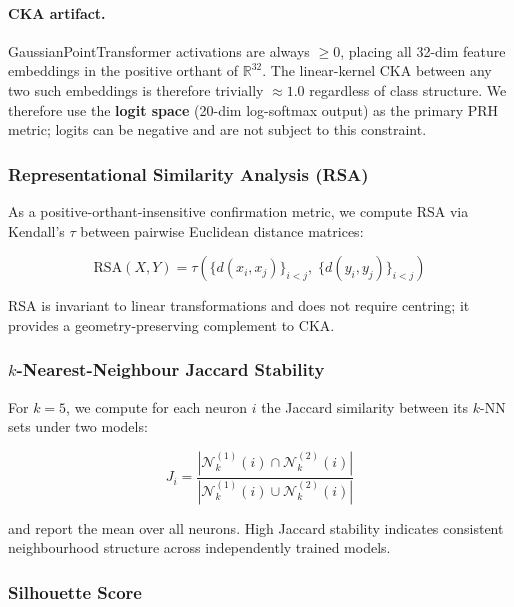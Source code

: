 \paragraph{CKA artifact.}
\label{sec:cka-artifact}
GaussianPointTransformer activations are always $\geq 0$, placing all 32-dim
feature embeddings in the positive orthant of $\mathbb{R}^{32}$.  The linear-kernel
CKA between any two such embeddings is therefore trivially $\approx 1.0$
regardless of class structure.  We therefore use the \textbf{logit space}
(20-dim log-softmax output) as the primary PRH metric; logits can be negative
and are not subject to this constraint.

\subsubsection{Representational Similarity Analysis (RSA)}

As a positive-orthant-insensitive confirmation metric, we compute RSA via
Kendall's $\tau$ between pairwise Euclidean distance matrices:

\begin{equation}
  \text{RSA}(X, Y) = \tau\!\left(\{d(x_i, x_j)\}_{i<j},\; \{d(y_i, y_j)\}_{i<j}\right)
\end{equation}

RSA is invariant to linear transformations and does not require centring; it
provides a geometry-preserving complement to CKA.

\subsubsection{$k$-Nearest-Neighbour Jaccard Stability}

For $k=5$, we compute for each neuron $i$ the Jaccard similarity between its
$k$-NN sets under two models:

\begin{equation}
  J_i = \frac{|\mathcal{N}_k^{(1)}(i) \cap \mathcal{N}_k^{(2)}(i)|}
             {|\mathcal{N}_k^{(1)}(i) \cup \mathcal{N}_k^{(2)}(i)|}
\end{equation}

and report the mean over all neurons.  High Jaccard stability indicates
consistent neighbourhood structure across independently trained models.

\subsubsection{Silhouette Score}

